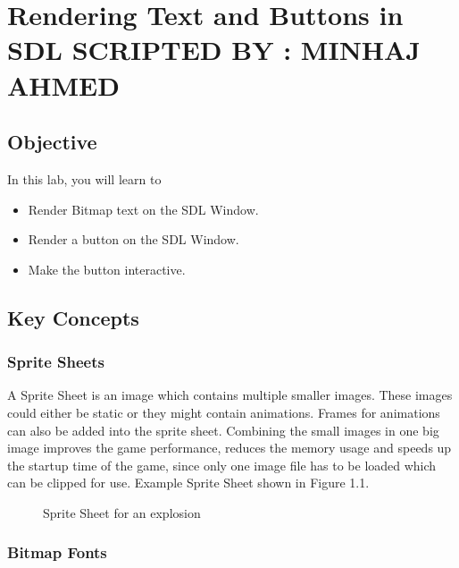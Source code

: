 \documentclass[11pt,fleqn]{book} %
\begin{document}
\pagestyle{fancy} %


\chapter{Rendering Text and Buttons in SDL \hspace{1mm} {\textsc{\small SCRIPTED BY : MINHAJ AHMED}}}

\section{Objective}

In this lab, you will learn to

\begin{itemize}
    \item Render Bitmap text on the SDL Window.
    \item Render a button on the SDL Window.
    \item Make the button interactive.
\end{itemize}

\section{Key Concepts}

\subsection{Sprite Sheets}
A Sprite Sheet is an image which contains multiple smaller images. These images could either be static or they might contain animations. Frames for animations can also be added into the sprite sheet. Combining the small images in one big image improves the game performance, reduces the memory usage and speeds up the startup time of the game, since only one image file has to be loaded which can be clipped for use. Example Sprite Sheet shown in Figure 1.1.

\begin{figure}[h]
    \centering
    \caption{Sprite Sheet for an explosion}
\end{figure}


\subsection{Bitmap Fonts}
\end{document}

